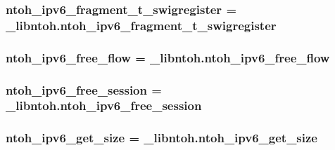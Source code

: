 \hypertarget{namespacelibntoh_a2f391b95631d6ab1238042e33d71c1db}{
\subsubsection[{ntoh\-\_\-ipv6\-\_\-fragment\-\_\-t\-\_\-swigregister}]{\setlength{\rightskip}{0pt plus 5cm}ntoh\-\_\-ipv6\-\_\-fragment\-\_\-t\-\_\-swigregister = \-\_\-libntoh.\-ntoh\-\_\-ipv6\-\_\-fragment\-\_\-t\-\_\-swigregister}}\label{namespacelibntoh_a2f391b95631d6ab1238042e33d71c1db}
\hypertarget{namespacelibntoh_aa0644758f576c005e8f9c9d1f752a8a3}{
\subsubsection[{ntoh\-\_\-ipv6\-\_\-free\-\_\-flow}]{\setlength{\rightskip}{0pt plus 5cm}ntoh\-\_\-ipv6\-\_\-free\-\_\-flow = \-\_\-libntoh.\-ntoh\-\_\-ipv6\-\_\-free\-\_\-flow}}\label{namespacelibntoh_aa0644758f576c005e8f9c9d1f752a8a3}
\hypertarget{namespacelibntoh_aa375f0ac6bebe31c151eb0893990fa2c}{
\subsubsection[{ntoh\-\_\-ipv6\-\_\-free\-\_\-session}]{\setlength{\rightskip}{0pt plus 5cm}ntoh\-\_\-ipv6\-\_\-free\-\_\-session = \-\_\-libntoh.\-ntoh\-\_\-ipv6\-\_\-free\-\_\-session}}\label{namespacelibntoh_aa375f0ac6bebe31c151eb0893990fa2c}
\hypertarget{namespacelibntoh_aca1a2ad8eeb69af02e68c66254bf2e79}{
\subsubsection[{ntoh\-\_\-ipv6\-\_\-get\-\_\-size}]{\setlength{\rightskip}{0pt plus 5cm}ntoh\-\_\-ipv6\-\_\-get\-\_\-size = \-\_\-libntoh.\-ntoh\-\_\-ipv6\-\_\-get\-\_\-size}}\label{namespacelibntoh_aca1a2ad8eeb69af02e68c66254bf2e79}
